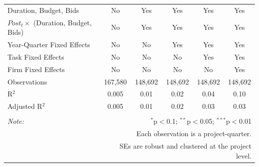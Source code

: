 \documentclass[
]{article}
\begin{document}
\begin{table}[H]
\begin{tabular}{@{\extracolsep{-2pt}}lccccc}
Duration, Budget, Bids & No & Yes & Yes & Yes & Yes \\ 
$Post_t \times $  (Duration, Budget, Bids) & No & Yes & Yes & Yes & Yes \\ 
Year-Quarter Fixed Effects & No & No & Yes & Yes & Yes \\ 
Task Fixed Effects & No & No & No & Yes & Yes \\ 
Firm Fixed Effects & No & No & No & No & Yes \\ 
Observations & 167,580 & 148,692 & 148,692 & 148,692 & 148,692 \\ 
R$^{2}$ & 0.005 & 0.01 & 0.02 & 0.04 & 0.10 \\ 
Adjusted R$^{2}$ & 0.005 & 0.01 & 0.02 & 0.03 & 0.03 \\ 
\hline 
\hline \\[-1.8ex] 
\textit{Note:}  & \multicolumn{5}{r}{$^{*}$p$<$0.1; $^{**}$p$<$0.05; $^{***}$p$<$0.01} \\ 
 & \multicolumn{5}{r}{Each observation is a project-quarter.} \\ 
 & \multicolumn{5}{r}{SEs are robust and clustered at the project level.} \\ 
\end{tabular} 
\end{table}
\end{document}
